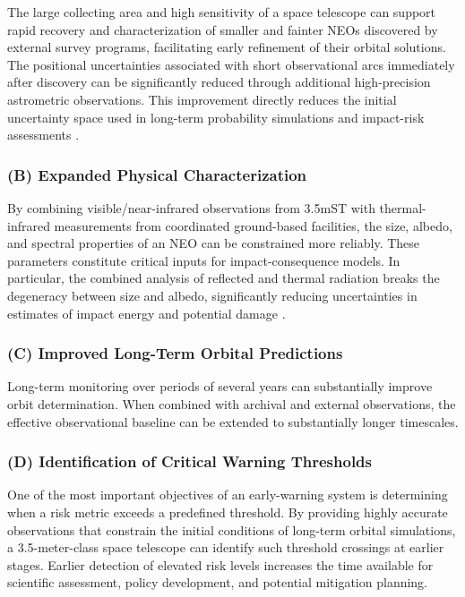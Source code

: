 The large collecting area and high sensitivity of a space telescope can support rapid recovery and characterization of smaller and fainter NEOs discovered by external survey programs, facilitating early refinement of their orbital solutions. The positional uncertainties associated with short observational arcs immediately after discovery can be significantly reduced through additional high-precision astrometric observations. This improvement directly reduces the initial uncertainty space used in long-term probability simulations and impact-risk assessments \cite{milani2005}.

\subsubsection{(B) Expanded Physical Characterization}\label{b-expanded-physical-characterization}

By combining visible/near-infrared observations from 3.5mST with thermal-infrared measurements from coordinated ground-based facilities, the size, albedo, and spectral properties of an NEO can be constrained more reliably. These parameters constitute critical inputs for impact-consequence models. In particular, the combined analysis of reflected and thermal radiation breaks the degeneracy between size and albedo, significantly reducing uncertainties in estimates of impact energy and potential damage \cite{mainzer2011}.

\subsubsection{(C) Improved Long-Term Orbital Predictions}\label{c-improved-long-term-orbital-predictions}

Long-term monitoring over periods of several years can substantially improve
orbit determination. When combined with archival and external observations,
the effective observational baseline can be extended to substantially longer
timescales.

\subsubsection{(D) Identification of Critical Warning Thresholds}\label{d-identification-of-critical-warning-thresholds}

One of the most important objectives of an early-warning system is determining when a risk metric exceeds a predefined threshold. By providing highly accurate observations that constrain the initial conditions of long-term orbital simulations, a 3.5-meter-class space telescope can identify such threshold crossings at earlier stages. Earlier detection of elevated risk levels increases the time available for scientific assessment, policy development, and potential mitigation planning.

